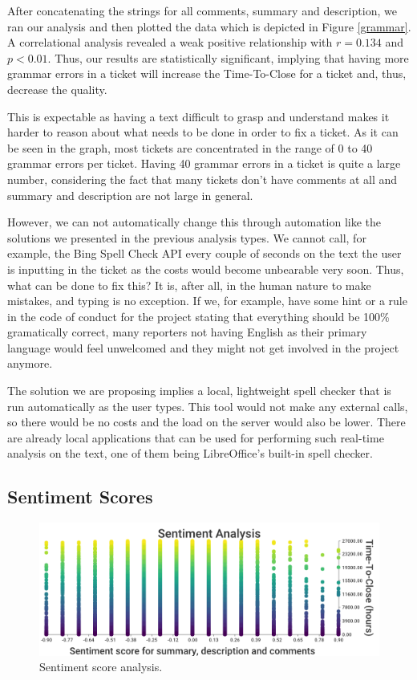 \documentclass{mpaper}
\begin{document}
After concatenating the strings for all comments, summary and description, we ran our analysis and then plotted the 
data which is depicted in Figure \ref{grammar}. A correlational analysis revealed a weak positive
relationship with $r = 0.134$ and $p < 0.01$. Thus, our results are statistically significant, implying that 
having more grammar errors in a ticket will increase the Time-To-Close for a ticket and, thus, decrease the quality. 

This is expectable as having a text difficult to grasp and understand makes it harder to reason about what needs 
to be done in order to fix a ticket. As it can be seen in the graph, most tickets are concentrated in the range of 
0 to 40 grammar errors per ticket. Having 40 grammar errors in a ticket is quite a large number, considering the fact 
that many tickets don't have comments at all and summary and description are not large in general. 

However, we can not automatically change this through automation like the solutions we presented in the previous 
analysis types. We cannot call, for example, the Bing Spell Check API every couple of seconds on the text the user 
is inputting in the ticket as the costs would become unbearable very soon. Thus, what can be done to fix this? It is, 
after all, in the human nature to make mistakes, and typing is no exception. If we, for example, have some hint or a rule
in the code of conduct for the project stating that everything should be 100\% gramatically correct, many reporters not 
having English as their primary language would feel unwelcomed and they might not get involved in the project anymore. 

The solution we are proposing implies a local, lightweight spell checker that is run automatically as the user types. 
This tool would not make any external calls, so there would be no costs and the load on the server would also be lower. 
There are already local applications that can be used for performing such real-time analysis on the text, one of them 
being LibreOffice's built-in spell checker.

\subsection{Sentiment Scores}

\begin{figure}[ht]
  \begin{center}
    \includegraphics[scale=0.25]{images/sentiment_analysis.png}
  \end{center}
  \caption{\label{sentiment}Sentiment score analysis.}
\end{figure}
\end{document}
